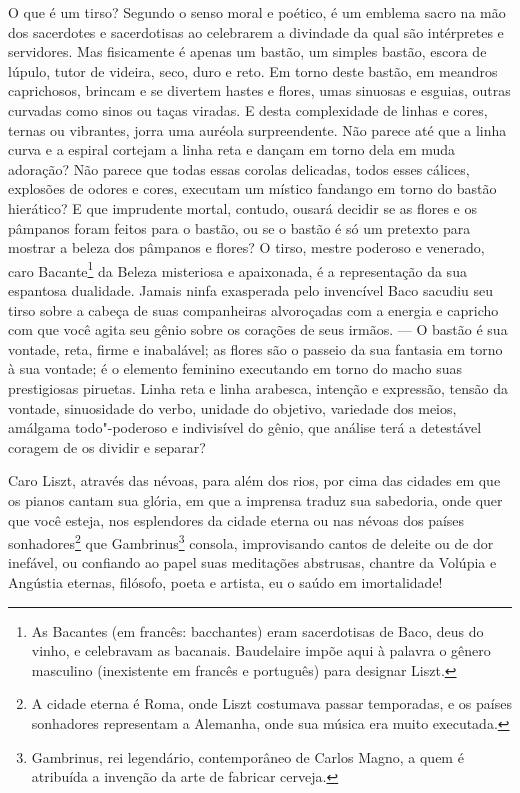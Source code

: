 O que é um tirso? Segundo o senso moral e poético, é
um emblema sacro na mão dos sacerdotes e sacerdotisas ao celebrarem
a divindade da qual são intérpretes e servidores. Mas fisicamente é
apenas um bastão, um simples bastão, escora de lúpulo, tutor de
videira, seco, duro e reto. Em torno deste bastão, em meandros
caprichosos, brincam e se divertem hastes e flores, umas sinuosas e
esguias, outras curvadas como sinos ou taças viradas. E desta complexidade de linhas e cores, ternas ou
vibrantes, jorra uma auréola surpreendente. Não parece até que a linha curva e a espiral cortejam a
linha reta e dançam em torno dela em muda adoração? Não parece que
todas essas corolas delicadas, todos esses cálices, explosões de odores
e cores, executam um místico fandango em torno do bastão hierático? E
que imprudente mortal, contudo, ousará decidir se as flores e os
pâmpanos foram feitos para o bastão, ou se o bastão é só um pretexto
para mostrar a beleza dos pâmpanos e flores? O tirso, mestre poderoso e
venerado, caro Bacante\footnote{  As Bacantes (em francês: bacchantes) eram sacerdotisas de Baco, deus do vinho, e celebravam as
bacanais. Baudelaire impõe aqui à palavra o gênero masculino (inexistente em francês e português) para designar Liszt.} da Beleza misteriosa e
apaixonada, é a
representação da sua espantosa dualidade. Jamais ninfa exasperada pelo invencível Baco sacudiu seu
tirso sobre a cabeça de suas companheiras alvoroçadas com a
energia e capricho com que você agita seu gênio sobre os corações de
seus irmãos. --- O bastão é sua vontade, reta, firme e inabalável; as
flores são o passeio
da sua fantasia em torno à sua vontade; é o
elemento feminino executando em torno do macho suas prestigiosas
piruetas. Linha reta e linha arabesca, intenção e expressão, tensão da
vontade, sinuosidade do verbo, unidade do objetivo, variedade dos
meios, amálgama todo"-poderoso e indivisível do gênio, que análise
terá a detestável coragem de os dividir e separar?

Caro Liszt, através das névoas, para além dos rios, por cima das cidades
em que os pianos cantam sua glória, em que a imprensa traduz sua
sabedoria, onde quer que você esteja, nos esplendores da cidade eterna
ou nas névoas dos países sonhadores\footnote{  A cidade eterna é Roma, 
onde Liszt costumava passar temporadas, e os
países sonhadores representam a Alemanha, onde sua música era muito
executada.} que Gambrinus\footnote{  Gambrinus, rei 
legendário, contemporâneo de Carlos Magno, a quem é
atribuída a invenção da arte de fabricar cerveja.}
consola, improvisando cantos de deleite ou
de dor inefável, ou confiando ao papel suas meditações abstrusas,
chantre da Volúpia e Angústia eternas, filósofo, poeta e artista, eu o
saúdo em imortalidade!

